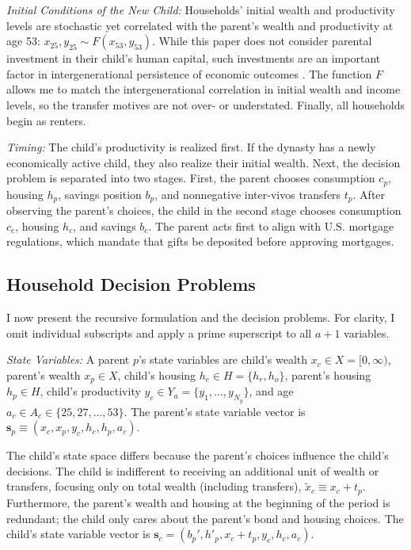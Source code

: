 \documentclass[12pt]{article}
\begin{document}
\textit{Initial Conditions of the New Child:} Households' initial wealth and productivity levels are stochastic yet correlated with the parent's wealth and productivity at age 53: $x_{25},y_{25} \sim F(x_{53},y_{53})$. While this paper does not consider parental investment in their child's human capital, such investments are an important factor in intergenerational persistence of economic outcomes \citep{Daruich2018,Lee2019}. The function $F$ allows me to match the intergenerational correlation in initial wealth and income levels, so the transfer motives are not over- or understated. Finally, all households begin as renters.

\textit{Timing:} The child's productivity is realized first. If the dynasty has a newly economically active child, they also realize their initial wealth. Next, the decision problem is separated into two stages. First, the parent chooses consumption $c_p$, housing $h_p$, savings position $b_p$, and nonnegative inter-vivos transfers $t_p$. After observing the parent's choices, the child in the second stage chooses consumption $c_c$, housing $h_c$, and savings $b_c$. The parent acts first to align with U.S. mortgage regulations, which mandate that gifts be deposited before approving mortgages.

\subsection{Household Decision Problems}
I now present the recursive formulation and the decision problems. For clarity, I omit individual subscripts and apply a prime superscript to all $a+1$ variables.

\textit{State Variables:} A parent $p$'s state variables are child's wealth $x_c\in X=[0,\infty)$, parent's wealth $x_p\in X$, child's housing $h_c\in H = \{h_r,h_o\}$, parent's housing $h_p\in H$, child's productivity $y_c\in Y_a=\{y_1,\dots,y_{N_y}\}$, and age $a_c\in A_c\in\{25,27,\dots,53\}$. The parent's state variable vector is $\mathbf{s}_p\equiv\left(x_c,x_p,y_c,h_c,h_p,a_c\right)$. 

The child's state space differs because the parent's choices influence the child's decisions. The child is indifferent to receiving an additional unit of wealth or transfers, focusing only on total wealth (including transfers), $\tilde x_c\equiv x_c+t_p$. Furthermore, the parent's wealth and housing at the beginning of the period is redundant; the child only cares about the parent's bond and housing choices. The child's state variable vector is $\mathbf{s}_c=\left(b_p',h'_p,x_c+t_p,y_c,h_c,a_c\right)$. 
\end{document}

